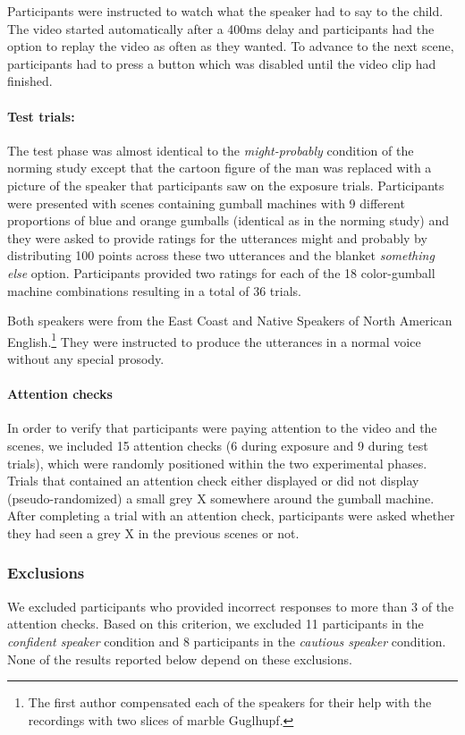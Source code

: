 \documentclass[man, floatsintext]{apa6}
\begin{document}
Participants were instructed to watch what the speaker had to say to the child. The video started automatically after a 400ms delay and participants had the option to replay the video as often as they wanted. To advance to the next scene, participants had to press a button which was disabled until the video clip had finished.

\paragraph{Test trials:} The test phase was almost identical to the  \textit{might-probably} condition of the norming study except that the cartoon figure of the man was replaced with a picture of the speaker that participants saw on the exposure trials. Participants were presented with scenes containing gumball machines with 9 different proportions of blue and orange gumballs  (identical as in the norming study) and they were asked to provide ratings for the utterances {\sc might} and {\sc probably} by distributing 100 points across these two utterances and the blanket {\it something else} option. Participants provided two ratings for each of the 18 color-gumball machine combinations resulting in a total of 36 trials. 

Both speakers were from the East Coast and Native Speakers of North American English.\footnote{The first author compensated each of the speakers for their help with the recordings with two slices of marble Guglhupf.} They were instructed to produce the utterances in a normal voice without any special prosody.


\paragraph{Attention checks}  In order to verify that participants were paying attention to the video and the scenes, we included 15 attention checks (6 during exposure and 9 during test trials), which were randomly positioned within the two experimental phases. Trials that contained an attention check either displayed or did not display (pseudo-randomized) a small grey X somewhere around the gumball machine. After completing a trial with an attention check, participants were asked whether they had seen a grey X in the previous scenes or not.

\subsubsection{Exclusions} We excluded participants who provided incorrect responses to more than 3 of the attention checks. Based on this criterion, we excluded 11 participants in the \textit{confident speaker} condition and 8 participants in the \textit{cautious speaker} condition. None of the results reported below depend on these exclusions.
\end{document}
